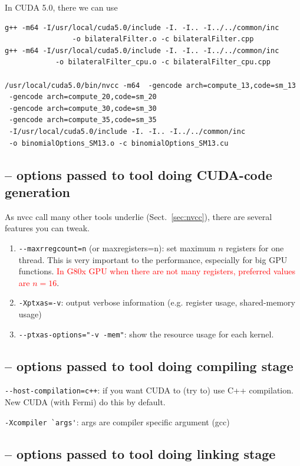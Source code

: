 In CUDA 5.0, there we can use
\begin{verbatim}
g++ -m64 -I/usr/local/cuda5.0/include -I. -I.. -I../../common/inc 
                -o bilateralFilter.o -c bilateralFilter.cpp
g++ -m64 -I/usr/local/cuda5.0/include -I. -I.. -I../../common/inc 
            -o bilateralFilter_cpu.o -c bilateralFilter_cpu.cpp

/usr/local/cuda5.0/bin/nvcc -m64  -gencode arch=compute_13,code=sm_13 
 -gencode arch=compute_20,code=sm_20 
 -gencode arch=compute_30,code=sm_30
 -gencode arch=compute_35,code=sm_35 
 -I/usr/local/cuda5.0/include -I. -I.. -I../../common/inc 
 -o binomialOptions_SM13.o -c binomialOptions_SM13.cu
\end{verbatim}

\subsection{-- options passed to tool doing CUDA-code generation}


As nvcc call many other tools underlie (Sect.~\ref{sec:nvcc}), there
are several features you can tweak.

\begin{enumerate}
\item \verb!--maxrregcount=n! (or maxregisters=n): set maximum $n$
  registers for one thread. This is very important to the performance,
  especially for big GPU functions.
  \textcolor{red}{In G80x GPU when there are not many registers,
    preferred values are $n=16$}.

\item \verb!-Xptxas=-v!: output verbose information (e.g. register
  usage, shared-memory usage)

\item \verb!--ptxas-options="-v -mem"!: show the resource usage for
  each kernel. 
  
\end{enumerate}

\subsection{-- options passed to tool doing compiling stage}

\verb!--host-compilation=c++!: if you want CUDA to (try to) use
C++ compilation. New CUDA (with Fermi) do this by default. 

\verb!-Xcompiler `args'!: args are compiler specific argument (gcc)
  
\subsection{-- options passed to tool doing linking stage}


